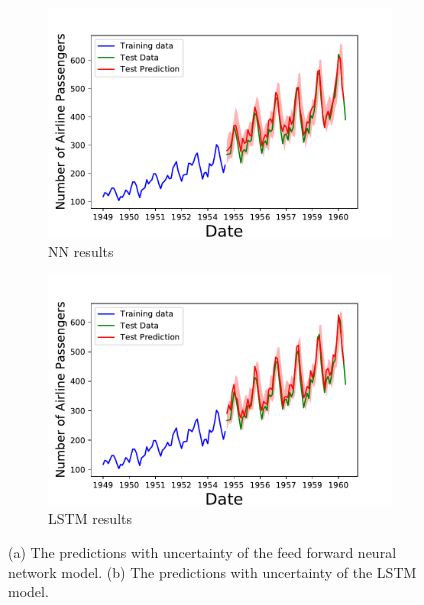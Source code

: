\documentclass[10pt,a4paper]{article}
\begin{document}
\begin{figure}[h]
\centering
\begin{subfigure}{.5\textwidth}
  \centering
  \includegraphics[scale=0.41]{Airline_Passengers_NN.pdf}
  \caption{NN results}
  \label{fig:NN results Airline}
\end{subfigure}%
\begin{subfigure}{.5\textwidth}
  \centering
  \includegraphics[scale=0.41]{Airline_Passengers_LSTN.pdf}
  \caption{LSTM results}
  \label{fig:LSTM results Airline}
\end{subfigure}
\caption{(a) The predictions with uncertainty of the feed forward neural network model. (b) The predictions with uncertainty of the LSTM model. }
\label{fig:results Airline}
\end{figure}
\end{document}
